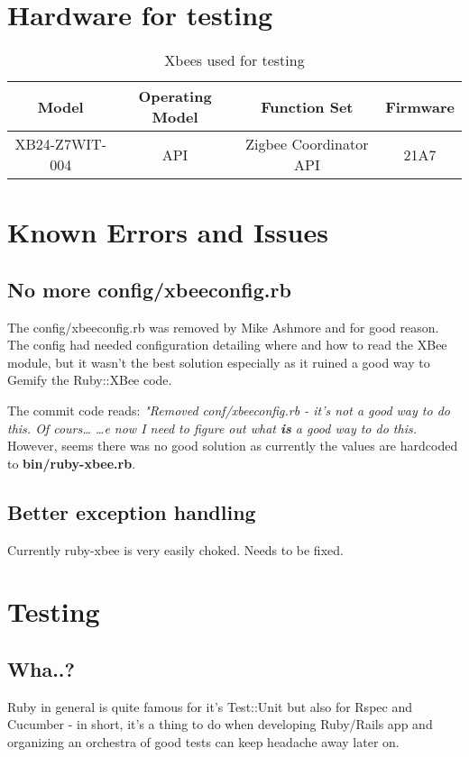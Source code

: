 \setlength{\parindent}{0pt}
\section{Hardware for testing}
\begin{table}[ht]
\caption{Xbees used for testing}
\centering
\begin{tabular}{c c c c}
\hline\hline
Model & Operating Model & Function Set & Firmware \\ [0.5ex] %
\hline
XB24-Z7WIT-004 & API & Zigbee Coordinator API & 21A7 \\ [1ex]
\hline
\end{tabular}
\label{table:nonlin}
\end{table}

\section{Known Errors and Issues}
\subsection{No more config/xbeeconfig.rb}
The config/xbeeconfig.rb was removed by Mike Ashmore and for good reason. The config had needed configuration detailing where and how to read the XBee module, but it wasn't the best solution especially as it ruined a good way to Gemify the Ruby::XBee code.

\noindent The commit code reads: \textit{"Removed conf/xbeeconfig.rb - it's not a good way to do this. Of cours… …e now I need to figure out what \textbf{is} a good way to do this.} However, seems there was no good solution as currently the values are hardcoded to \textbf{bin/ruby-xbee.rb}.

\subsection{Better exception handling}
Currently ruby-xbee is very easily choked. Needs to be fixed.

\section{Testing}
\subsection{Wha..?}
Ruby in general is quite famous for it's Test::Unit but also for Rspec and Cucumber - in short, it's a thing to do when developing Ruby/Rails app and organizing an orchestra of good tests can keep headache away later on.

